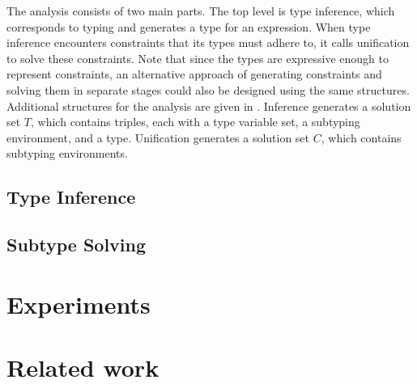 \documentclass[sigplan,screen,review]{acmart}
\begin{document}
The analysis consists of two main parts. The top level is type inference, which corresponds to typing
and generates a type for an expression. When type inference encounters constraints that its types must adhere to,
it calls unification to solve these constraints. Note that since the types are expressive enough to represent constraints,
an alternative approach of generating constraints and solving them in separate stages could also be designed 
using the same structures. Additional structures for the analysis are given in . 
Inference generates a solution set $T$, which contains triples, each with a type variable set, a subtyping environment, and a type.  
Unification generates a solution set $C$, which contains subtyping environments. 


\subsection{Type Inference}

\subsection{Subtype Solving}


\section{Experiments}


\section{Related work}

\end{document}
